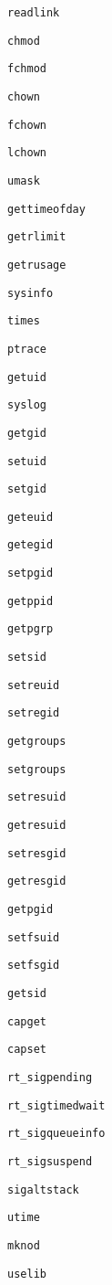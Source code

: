 \verb+readlink+

\verb+chmod+

\verb+fchmod+

\verb+chown+

\verb+fchown+

\verb+lchown+

\verb+umask+

\verb+gettimeofday+

\verb+getrlimit+

\verb+getrusage+

\verb+sysinfo+

\verb+times+

\verb+ptrace+

\verb+getuid+

\verb+syslog+

\verb+getgid+

\verb+setuid+

\verb+setgid+

\verb+geteuid+

\verb+getegid+

\verb+setpgid+

\verb+getppid+

\verb+getpgrp+

\verb+setsid+

\verb+setreuid+

\verb+setregid+

\verb+getgroups+

\verb+setgroups+

\verb+setresuid+

\verb+getresuid+

\verb+setresgid+

\verb+getresgid+

\verb+getpgid+

\verb+setfsuid+

\verb+setfsgid+

\verb+getsid+

\verb+capget+

\verb+capset+

\verb+rt_sigpending+

\verb+rt_sigtimedwait+

\verb+rt_sigqueueinfo+

\verb+rt_sigsuspend+

\verb+sigaltstack+

\verb+utime+

\verb+mknod+

\verb+uselib+

